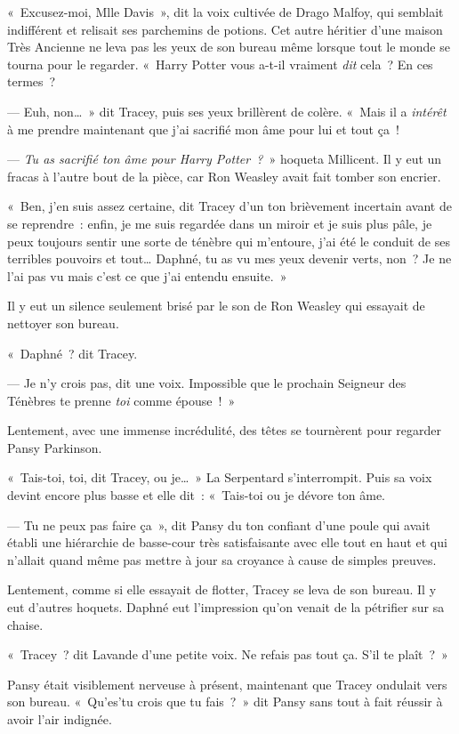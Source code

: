 «~Excusez-moi, Mlle Davis~», dit la voix cultivée de Drago Malfoy, qui semblait indifférent et relisait ses parchemins de potions.
Cet autre héritier d'une maison Très Ancienne ne leva pas les yeux de son bureau même lorsque tout le monde se tourna pour le regarder.
«~Harry Potter vous a-t-il vraiment \emph{dit} cela~?
En ces termes~?

--- Euh, non…~»
dit Tracey, puis ses yeux brillèrent de colère.
«~Mais il a \emph{intérêt} à me prendre maintenant que j'ai sacrifié mon âme pour lui et tout ça~!

--- \emph{Tu as sacrifié ton âme pour Harry Potter~?}~» hoqueta Millicent.
Il y eut un fracas à l'autre bout de la pièce, car Ron Weasley avait fait tomber son encrier.

«~Ben, j'en suis assez certaine, dit Tracey d'un ton brièvement incertain avant de se reprendre~: enfin, je me suis regardée dans un miroir et je suis plus pâle, je peux toujours sentir une sorte de ténèbre qui m'entoure, j'ai été le conduit de ses terribles pouvoirs et tout…
Daphné, tu as vu mes yeux devenir verts, non~?
Je ne l'ai pas vu mais c'est ce que j'ai entendu ensuite.~»

Il y eut un silence seulement brisé par le son de Ron Weasley qui essayait de nettoyer son bureau.

«~Daphné~? dit Tracey.

--- Je n'y crois pas, dit une voix.
Impossible que le prochain Seigneur des Ténèbres te prenne \emph{toi} comme épouse~!~»

Lentement, avec une immense incrédulité, des têtes se tournèrent pour regarder Pansy Parkinson.

«~Tais-toi, toi, dit Tracey, ou je…~»
La Serpentard s'interrompit.
Puis sa voix devint encore plus basse et elle dit~: «~Tais-toi ou je dévore ton âme.

--- Tu ne peux pas faire ça~», dit Pansy du ton confiant d'une poule qui avait établi une hiérarchie de basse-cour très satisfaisante avec elle tout en haut et qui n'allait quand même pas mettre à jour sa croyance à cause de simples preuves.

Lentement, comme si elle essayait de flotter, Tracey se leva de son bureau.
Il y eut d'autres hoquets.
Daphné eut l'impression qu'on venait de la pétrifier sur sa chaise.

«~Tracey~? dit Lavande d'une petite voix.
Ne refais pas tout ça.
S'il te plaît~?~»

Pansy était visiblement nerveuse à présent, maintenant que Tracey ondulait vers son bureau.
«~Qu'es'tu crois que tu fais~?~»
dit Pansy sans tout à fait réussir à avoir l'air indignée.

